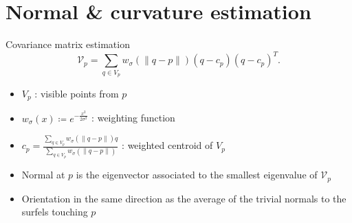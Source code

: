 \documentclass[11pt]{beamer}
\begin{document}
    \section{Normal \& curvature estimation}
    \begin{frame}{Covariance matrix estimation}
        \newcommand{\Kernel}[1]{\ensuremath{w_{\sigma}(#1)}}
        \begin{equation}
            \mathcal{V}_p = \sum_{q \in V_p} \Kernel{\|q-p\|}(q - c_p)(q - c_p)^T.
        \end{equation}
        \begin{itemize}
            \item $V_p$ : visible points from $p$
            \item $\Kernel{x}\coloneqq e^{-\frac{x^2}{2\sigma^2}}$ : weighting function
            \item $c_p = \frac{\sum_{q \in V_p} \Kernel{\|q-p\|} q}{\sum_{q \in V_p} \Kernel{\|q-p\|}}$ : weighted centroid of $V_p$
            \item Normal at $p$ is the eigenvector associated to the smallest eigenvalue of $\mathcal{V}_p$
            \item Orientation in the same direction as the average of the trivial normals to the surfels touching $p$
        \end{itemize}
    \end{frame}
\end{document}
